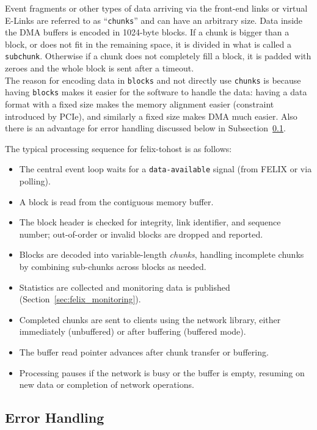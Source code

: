 Event fragments or other types of data arriving via the front-end links or virtual E-Links are referred to as “\texttt{chunks}” and can have an arbitrary size. Data inside the \acs{DMA} buffers is encoded in 1024-byte blocks. If a chunk is bigger than a block, or does not fit in the remaining space, it is divided in what is called a \texttt{subchunk}. Otherwise if a chunk does not completely fill a block, it is padded with zeroes and the whole block is sent after a timeout.\\
The reason for encoding data in \texttt{blocks} and not directly use \texttt{chunks} is because having \texttt{blocks} makes it easier for the software to handle the data: having a data format with a fixed size makes the memory alignment easier (constraint introduced by \acs{PCIe}), and similarly a fixed size makes \acs{DMA} much easier. Also there is an advantage for error handling discussed below in Subsection~\ref{sec:felix_tohost_error_handling}.

The typical processing sequence for felix-tohost is as follows:
\begin{itemize}
    \item The central event loop waits for a \texttt{data-available} signal (from \acs{FELIX} or via polling).
    \item A block is read from the contiguous memory buffer.
    \item The block header is checked for integrity, link identifier, and sequence number; out-of-order or invalid blocks are dropped and reported.
    \item Blocks are decoded into variable-length \emph{chunks}, handling incomplete chunks by combining sub-chunks across blocks as needed.
    \item Statistics are collected and monitoring data is published (Section~\ref{sec:felix_monitoring}).
    \item Completed chunks are sent to clients using the network library, either immediately (unbuffered) or after buffering (buffered mode).
    \item The buffer read pointer advances after chunk transfer or buffering.
    \item Processing pauses if the network is busy or the buffer is empty, resuming on new data or completion of network operations.
\end{itemize}

\subsection{Error Handling}
\label{sec:felix_tohost_error_handling}

